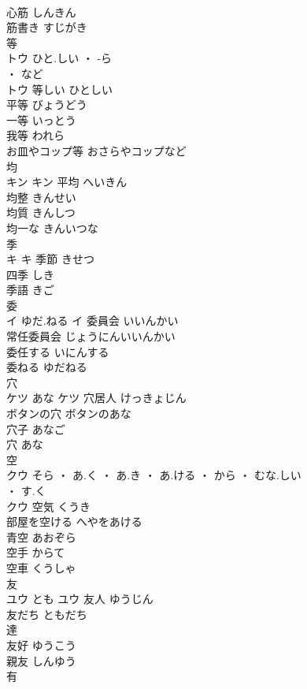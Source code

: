\documentclass[8pt]{extreport}
\begin{document}
\begin{CJK}{UTF8}{min}
\\	心筋	しんきん	
\\	筋書き	すじがき	
\\	等	
\\	トウ	ひと.しい ・ -ら
\\	・ など
\\	トウ	等しい	ひとしい	
\\	平等	びょうどう	
\\	一等	いっとう	
\\	我等	われら	
\\	お皿やコップ等	おさらやコップなど	
\\	均	
\\	キン		キン	平均	へいきん	
\\	均整	きんせい	
\\	均質	きんしつ	
\\	均一な	きんいつな	
\\	季	
\\	キ		キ	季節	きせつ	
\\	四季	しき	
\\	季語	きご	
\\	委	
\\	イ	ゆだ.ねる	イ	委員会	いいんかい	
\\	常任委員会	じょうにんいいんかい	
\\	委任する	いにんする	
\\	委ねる	ゆだねる	
\\	穴	
\\	ケツ	あな	ケツ	穴居人	けっきょじん	
\\	ボタンの穴	ボタンのあな	
\\	穴子	あなご	
\\	穴	あな	
\\	空	
\\	クウ	そら ・ あ.く ・ あ.き ・ あ.ける ・ から ・ むな.しい
\\	・ す.く
\\	クウ	空気	くうき	
\\	部屋を空ける	へやをあける	
\\	青空	あおぞら	
\\	空手	からて	
\\	空車	くうしゃ	
\\	友	
\\	ユウ	とも	ユウ	友人	ゆうじん	
\\	友だち	ともだち	
\\	達 
\\	友好	ゆうこう	
\\	親友	しんゆう	
\\	有	

\end{CJK}
\end{document}
